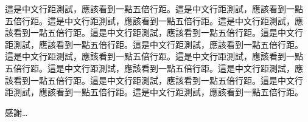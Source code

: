 \begin{acknowledgementszh}
這是中文行距測試，應該看到一點五倍行距。這是中文行距測試，應該看到一點
五倍行距。這是中文行距測試，應該看到一點五倍行距。這是中文行距測試，應
該看到一點五倍行距。這是中文行距測試，應該看到一點五倍行距。這是中文行
距測試，應該看到一點五倍行距。這是中文行距測試，應該看到一點五倍行距。
這是中文行距測試，應該看到一點五倍行距。這是中文行距測試，應該看到一點
五倍行距。這是中文行距測試，應該看到一點五倍行距。這是中文行距測試，應
該看到一點五倍行距。這是中文行距測試，應該看到一點五倍行距。這是中文行
距測試，應該看到一點五倍行距。這是中文行距測試，應該看到一點五倍行距。

感謝\ldots
\end{acknowledgementszh}

\begin{acknowledgementsen}






\end{acknowledgementsen}
